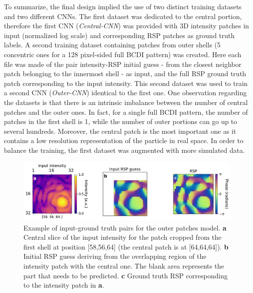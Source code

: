 To summarize, the final design implied the use of two distinct training datasets and two different CNNs. 
The first dataset was dedicated to the central portion, therefore the first CNN (\textit{Central-CNN}) was provided with 3D intensity patches in 
input (normalized log scale) and corresponding RSP patches as ground truth labels. A second training dataset containing 
patches from outer shells (5 concentric ones for a 128 pixel-sided full BCDI pattern) was created. Here each file was made 
of the pair intensity-RSP initial guess - from the closest neighbor patch belonging to the innermost shell -  as input,
and the full RSP ground truth patch corresponding to the input intensity. This second dataset was used to train a second 
CNN (\textit{Outer-CNN}) identical to the first one. One observation regarding the datasets is that there is an intrinsic imbalance between the 
number of central patches and the outer ones. In fact, for a single full BCDI pattern, the number of patches in the first shell is 1, 
while the number of outer portions can go up to several hundreds. Moreover, the central patch is the most important one as it 
contains a low resolution representation of the particle in real space. In order to balance the training, the first dataset was 
augmented with more simulated data. 

\begin{figure}[H]
    \centering
    \includegraphics[width=\textwidth]{figures/Phasing/guess_RSP.pdf}
    \caption{Example of input-ground truth pairs for the outer patches model. \textbf{a} Central slice of the input intensity 
    for the patch cropped from the first shell at position [58,56,64] (the central patch is at [64,64,64]). \textbf{b} Initial 
    RSP guess deriving from the overlapping region of the intensity patch with the central one. The blank area represents 
    the part that needs to be predicted. \textbf{c} Ground truth RSP corresponding to the intensity patch in \textbf{a}.}
    
    \label{fig:patches_Xy}

\end{figure}

